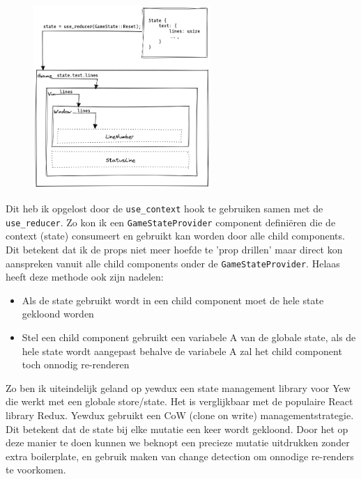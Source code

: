 \clearpage

\begin{figure}[h]
  \centering
  \includegraphics[width=0.6\textwidth]{./figures/use_reducer.png}
\end{figure}

Dit heb ik opgelost door de \texttt{use_context} hook te gebruiken samen met de
\texttt{use_reducer}. Zo kon ik een \texttt{GameStateProvider} component
definiëren die de context (state) consumeert en gebruikt kan worden door alle child components. Dit
betekent dat ik de props niet meer hoefde te 'prop drillen' maar direct kon aanspreken vanuit alle
child components onder de \texttt{GameStateProvider}. Helaas heeft deze methode ook zijn
nadelen: 
\begin{itemize}
    \item Als de state gebruikt wordt in een child component moet de hele state gekloond worden 

    \item Stel een child component gebruikt een variabele A van de globale state, als de hele state
    wordt aangepast behalve de variabele A zal het child component toch onnodig re-renderen 
\end{itemize}

Zo ben ik uiteindelijk geland op yewdux een state management library voor Yew die werkt met een
globale store/state. Het is verglijkbaar met de populaire React library Redux. Yewdux gebruikt een
CoW (clone on write) managementstrategie. Dit betekent dat de state bij elke mutatie een keer wordt
gekloond. Door het op deze manier te doen kunnen we beknopt een precieze mutatie uitdrukken zonder
extra boilerplate, en gebruik maken van change detection om onnodige re-renders te voorkomen. 


